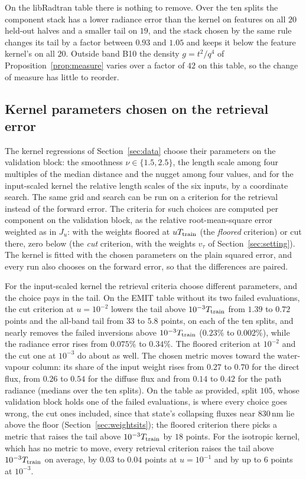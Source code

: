 \documentclass[11pt]{article}
\theoremstyle{remark}
\newcommand{\1}{\mathbf{1}}
\begin{document}
On the libRadtran table there is nothing to remove. Over the ten splits the component stack has a lower radiance
error than the kernel on features on all $20$ held-out halves and a smaller tail on $19$, and the stack chosen by the
same rule changes its tail by a factor between $0.93$ and $1.05$ and keeps it below the feature kernel's on all $20$.
Outside band B10 the density $g=t^2/q^4$ of Proposition~\ref{prop:measure} varies over a factor of $42$ on this table,
so the change of measure has little to reorder.

\subsection{Kernel parameters chosen on the retrieval error}\label{sec:kernels}

The kernel regressions of Section~\ref{sec:data} choose their parameters on the validation block: the smoothness
$\nu\in\{1.5,2.5\}$, the length scale among four multiples of the median distance and the nugget among four values,
and for the input-scaled kernel the relative length scales of the six inputs, by a coordinate search. The same grid and
search can be run on a criterion for the retrieval instead of the forward error. The criteria for such choices are
computed per component on the validation block, as the relative root-mean-square error weighted as in $J_u$: with the
weights floored at $uT_{\rm train}$ (the \emph{floored} criterion) or cut there, zero below (the \emph{cut} criterion,
with the weights $v_\tau$ of Section~\ref{sec:setting}). The kernel is fitted with the chosen parameters on the plain
squared error, and every run also chooses on the forward error, so that the differences are paired.

For the input-scaled kernel the retrieval criteria choose different parameters, and the choice pays in the tail. On
the EMIT table without its two failed evaluations, the cut criterion at $u=10^{-2}$ lowers the tail above
$10^{-3}T_{\rm train}$ from $1.39$ to $0.72$ points and the all-band tail from $33$ to $5.8$ points, on each of the
ten splits, and nearly removes the failed inversions above $10^{-3}T_{\rm train}$ ($0.23\%$ to $0.002\%$), while the
radiance error rises from $0.075\%$ to $0.34\%$. The floored criterion at $10^{-2}$ and the cut one at $10^{-3}$ do about
as well. The chosen metric moves toward the water-vapour column: its share of the input weight rises from $0.27$ to
$0.70$ for the direct flux, from $0.26$ to $0.54$ for the diffuse flux and from $0.14$ to $0.42$ for the path radiance
(medians over the ten splits). On the table as provided, split $105$, whose validation block holds one of the failed
evaluations, is where every choice goes wrong, the cut ones included, since that state's collapsing fluxes near
$830$\,nm lie above the floor (Section~\ref{sec:weightsits}); the floored criterion there picks a metric that raises the tail
above $10^{-3}T_{\rm train}$ by $18$ points. For the isotropic kernel, which has no metric to move, every retrieval
criterion raises the tail above $10^{-3}T_{\rm train}$ on average, by $0.03$ to $0.04$ points at $u=10^{-1}$ and by up to
$6$ points at $10^{-3}$.
\end{document}
